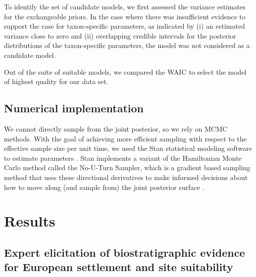 \documentclass[12pt]{article}
\begin{document}
To identify the set of candidate models, we first assessed the
variance estimates for the exchangeable priors. In the case where
there was insufficient evidence to support the case for taxon-specific
parameters, as indicated by (i) an estimated variance close to zero
and (ii) overlapping credible intervals for the posterior
distributions of the taxon-specific parameters, the model was not
considered as a candidate model.

Out of the suite of suitable models, we compared the WAIC to select the
model of highest quality for our data set.

\subsection{Numerical implementation}

We cannot directly sample from the joint posterior, so we rely on MCMC
methods. With the goal of achieving more efficient sampling with
respect to the effective sample size per unit time, we used the Stan
statistical modeling software to estimate parameters
\citep{stan-software:2014}. Stan implements a variant of the
Hamiltonian Monte Carlo method called the No-U-Turn Sampler, which is
a gradient based sampling method that uses these directional
derivatives to make informed decisions about how to move along (and
sample from) the joint posterior surface \citep{hoffman2011nuts}.



\section{Results}

\subsection{Expert elicitation of biostratigraphic evidence for European settlement and site suitability}
\end{document}
